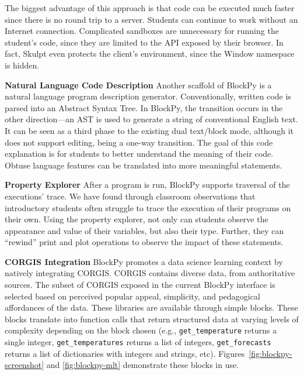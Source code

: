 \documentclass[10pt,journal,compsoc]{IEEEtran}
\begin{document}
The biggest advantage of this approach is that code can be executed much faster since there is no round trip to a server.
Students can continue to work without an Internet connection.
Complicated sandboxes are unnecessary for running the student's code, since they are limited to the API exposed by their browser.
In fact, Skulpt even protects the client's environment, since the Window namespace is hidden.

\medskip
\textbf{Natural Language Code Description}
Another scaffold of BlockPy is a natural language program description generator.
Conventionally, written code is parsed into an Abstract Syntax Tree.
In BlockPy, the transition occurs in the other direction---an AST is used to generate a string of conventional English text.
It can be seen as a third phase to the existing dual text/block mode, although it does not support editing, being a one-way transition.
The goal of this code explanation is for students to better understand the meaning of their code.
Obtuse language features can be translated into more meaningful statements.

\medskip
\textbf{Property Explorer}
After a program is run, BlockPy supports traversal of the executions' trace.
We have found through classroom observations that introductory students often struggle to trace the execution of their programs on their own.
Using the property explorer, not only can students observe the appearance and value of their variables, but also their type.
Further, they can ``rewind'' print and plot operations to observe the impact of these statements.


\medskip
\textbf{CORGIS Integration}
BlockPy promotes a data science learning context by natively integrating CORGIS.
CORGIS contains diverse data, from authoritative sources.
The subset of CORGIS exposed in the current BlockPy interface is selected based on perceived popular appeal, simplicity, and pedagogical affordances of the data.
These libraries are available through simple blocks.
These blocks translate into function calls that return structured data at varying levels of complexity depending on the block chosen (e.g., \texttt{get\_temperature} returns a single integer, \texttt{get\_temperatures} returns a list of integers, \texttt{get\_forecasts} returns a list of dictionaries with integers and strings, etc).
Figures~\ref{fig:blockpy-screenshot} and \ref{fig:blockpy-mlt} demonstrate these blocks in use.
\end{document}
